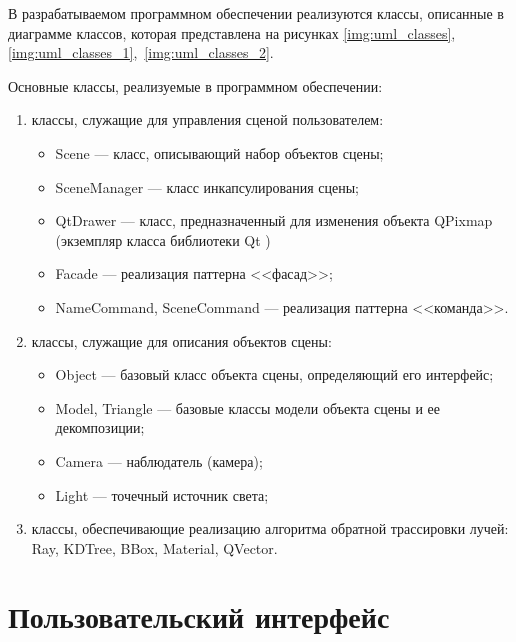 В разрабатываемом программном обеспечении реализуются классы, описанные в диаграмме классов, которая представлена на рисунках \ref{img:uml_classes}, \ref{img:uml_classes_1},~\ref{img:uml_classes_2}.




Основные классы, реализуемые в программном обеспечении:

\begin{enumerate}
	\item {
		классы, служащие для управления сценой пользователем:
		\begin{itemize}
			\item Scene --- класс, описывающий набор объектов сцены;
			\item SceneManager --- класс инкапсулирования сцены;
			\item QtDrawer --- класс, предназначенный для изменения объекта QPixmap (экземпляр класса библиотеки Qt \cite{qt})
			\item Facade --- реализация паттерна <<фасад>>;
			\item NameCommand, SceneCommand --- реализация паттерна <<команда>>.
		\end{itemize}
}
	\item {
		классы, служащие для описания объектов сцены:
		\begin{itemize}
			\item Object --- базовый класс объекта сцены, определяющий его интерфейс;
			\item Model, Triangle --- базовые классы модели объекта сцены и ее декомпозиции;
			\item Camera --- наблюдатель (камера);
			\item Light --- точечный источник света;
		\end{itemize}
}
	\item {
		классы, обеспечивающие реализацию алгоритма обратной трассировки лучей: Ray, KDTree, BBox, Material, QVector.
}
\end{enumerate}

\clearpage

\section{Пользовательский интерфейс}